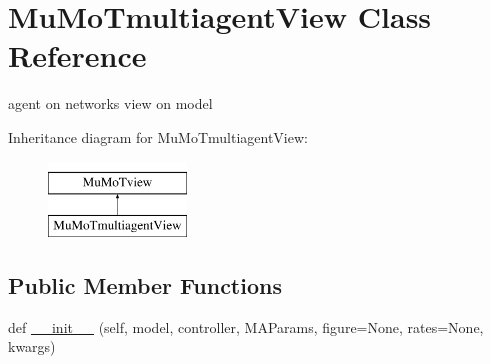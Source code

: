 \hypertarget{class_mu_mo_t_1_1_mu_mo_t_1_1_mu_mo_tmultiagent_view}{}\section{Mu\+Mo\+Tmultiagent\+View Class Reference}
\label{class_mu_mo_t_1_1_mu_mo_t_1_1_mu_mo_tmultiagent_view}


agent on networks view on model  


Inheritance diagram for Mu\+Mo\+Tmultiagent\+View\+:\begin{figure}[H]
\begin{center}
\leavevmode
\includegraphics[height=2.000000cm]{class_mu_mo_t_1_1_mu_mo_t_1_1_mu_mo_tmultiagent_view}
\end{center}
\end{figure}
\subsection*{Public Member Functions}
\begin{DoxyCompactItemize}
\item 
def \hyperlink{class_mu_mo_t_1_1_mu_mo_t_1_1_mu_mo_tmultiagent_view_a3245dc2f896377d0265400e8181e7502}{\+\_\+\+\_\+init\+\_\+\+\_\+} (self, model, controller, M\+A\+Params, figure=None, rates=None, kwargs)
\end{DoxyCompactItemize}
